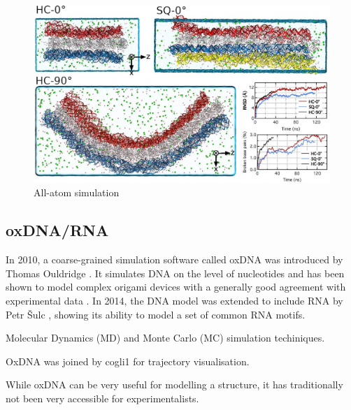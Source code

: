 
\begin{figure}[h]
  \begin{center}
    \includegraphics[width=\textwidth]{figures/all-atom.jpg}
    \caption{All-atom simulation}
    \label{fig:all-atom}
  \end{center}
\end{figure}

\subsection{oxDNA/RNA}
\label{sec:oxDNA}
In 2010, a coarse-grained simulation software called oxDNA was introduced by Thomas Ouldridge \cite{ouldridge2010dna}. It simulates DNA on the level of nucleotides and has been shown to model complex origami devices with a generally good agreement with experimental data \cite{sharma2017characterizing}. In 2014, the DNA model was extended to include RNA by Petr {\v{S}}ulc \cite{vsulc2014nucleotide}, showing its ability to model a set of common RNA motifs. 

Molecular Dynamics (MD) and Monte Carlo (MC) simulation techiniques.

OxDNA was joined by cogli1 for trajectory visualisation.



While oxDNA can be very useful for modelling a structure, it has traditionally not been very accessible for experimentalists. %

